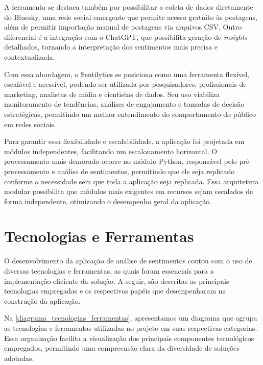 \documentclass[
	12pt,				%
	oneside,			%
	a4paper,			%
	english,			%
	french,				%
	spanish,			%
	brazil				%
	]{abntex2}
\begin{document}
A ferramenta se destaca também por possibilitar a coleta de dados
diretamente do Bluesky, uma rede social emergente que permite acesso
gratuito às postagens, além de permitir importação manual de postagens
via arquivos CSV. Outro diferencial é a integração com o ChatGPT, que
possibilita geração de \emph{insights} detalhados, tornando a
interpretação dos sentimentos mais precisa e contextualizada.

Com essa abordagem, o Sentilytics se posiciona como uma ferramenta
flexível, escalável e acessível, podendo ser utilizada por
pesquisadores, profissionais de marketing, analistas de mídia e
cientistas de dados. Seu uso viabiliza monitoramento de tendências,
análises de engajamento e tomadas de decisão estratégicas, permitindo um
melhor entendimento do comportamento do público em redes sociais.

Para garantir essa flexibilidade e escalabilidade, a aplicação foi
projetada em módulos independentes, facilitando um escalonamento
horizontal. O processamento mais demorado ocorre no módulo Python,
responsável pelo pré-processamento e análise de sentimentos, permitindo
que ele seja replicado conforme a necessidade sem que toda a aplicação
seja replicada. Essa arquitetura modular possibilita que módulos mais
exigentes em recursos sejam escalados de forma independente, otimizando
o desempenho geral da aplicação.

\hypertarget{tecnologias-e-ferramentas}{%
\section{Tecnologias e Ferramentas}\label{tecnologias-e-ferramentas}}

O desenvolvimento da aplicação de análise de sentimentos contou com o
uso de diversas tecnologias e ferramentas, as quais foram essenciais
para a implementação eficiente da solução. A seguir, são descritas as
principais tecnologias empregadas e os respectivos papéis que
desempenharam na construção da aplicação.

Na \autoref{diagrama_tecnologias_ferramentas}, apresentamos um diagrama
que agrupa as tecnologias e ferramentas utilizadas no projeto em suas
respectivas categorias. Essa organização facilita a visualização dos
principais componentes tecnológicos empregados, permitindo uma
compreensão clara da diversidade de soluções adotadas.
\end{document}
